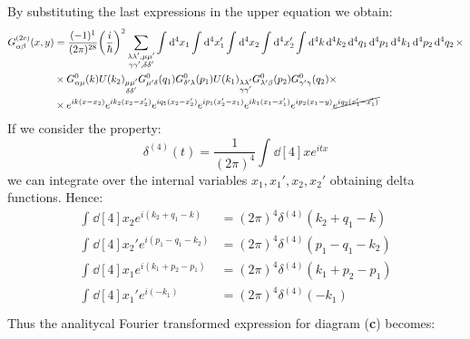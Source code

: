 \documentclass[11pt, a4paper, twoside, openright]{article}
\begin{document}
By substituting the last expressions in the upper equation we obtain:
\begin{equation*}
\begin{split}
  G_{\alpha \beta }^{(2c)} (x,y) &= \frac{(-1)^1}{(2 \pi )^{28}} \qty(\frac{i}{\hbar })^2
   \sum_{\substack{\lambda \lambda', \mu \mu' \\ \gamma \gamma', \delta \delta'   } }^{} \int_{}^{} \dd[4]{x_1} \int_{}^{} \dd[4]{x_1'} \int_{}^{} \dd[4]{x_2} \int_{}^{} \dd[4]{x_2'} \int_{}^{} \dd[4]{k} \dd[4]{k_2} \dd[4]{q_1} \dd[4]{p_1} \dd[4]{k_1} \dd[4]{p_2} \dd[4]{q_2}  \times \\
   & \times G^0_{\alpha \mu } (k) U (k_2)_{\substack{ \mu \mu' \\ \delta \delta'} } G^0_{\mu' \delta } (q_1) G^0_{\delta' \lambda  } (p_1) U (k_1)_{\substack{ \lambda \lambda' \\ \gamma \gamma'} } G^0_{\lambda' \beta  } (p_2) G^0_{\gamma' \gamma  } (q_2) \times \\
   & \times e^{i k (x-x_2)} e^{i k_2 (x_2-x_2')} e^{i q_1 (x_2-x_2')} e^{i p_1 (x_2'-x_1)} e^{i k_1 (x_1-x_1')} e^{i p_2 (x_1-y)} \cancel{e^{i q_2 (x_1'-x_1')} }
\end{split}
\end{equation*}
If we consider the property:
\begin{equation*}
  \delta ^{(4)} (t) = \frac{1}{(2 \pi )^4} \int_{}^{} \dd[4]{x} e^{i t x}
\end{equation*}
we can integrate over the internal variables \( x_1,x_1',x_2,x_2' \) obtaining delta functions. Hence:
\begin{subequations}
\begin{align*}
  \int_{}^{} \dd[4]{x_2} e^{i (k_2+q_1-k)}   &= (2 \pi )^4 \delta ^{(4)} (k_2+q_1-k) \\
  \int_{}^{} \dd[4]{x_2'} e^{i (p_1-q_1-k_2)}   &= (2 \pi )^4 \delta ^{(4)} (p_1-q_1-k_2) \\
  \int_{}^{} \dd[4]{x_1} e^{i (k_1+p_2-p_1)}   &= (2 \pi )^4 \delta ^{(4)} (k_1+p_2-p_1) \\
  \int_{}^{} \dd[4]{x_1'} e^{i (-k_1)}   &= (2 \pi )^4 \delta ^{(4)} (-k_1) \\
\end{align*}
\end{subequations}
Thus the analitycal Fourier transformed expression for diagram (\textbf{c}) becomes:
\end{document}
